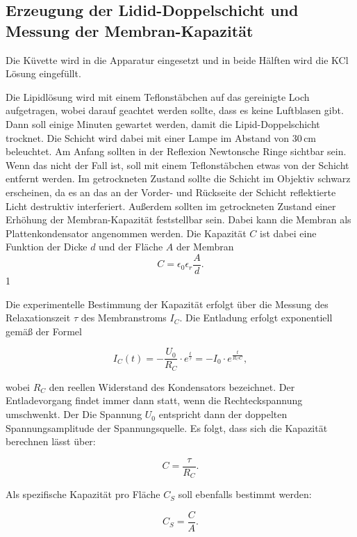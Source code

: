 \documentclass[a4paper,ngerman]{scrartcl}
\begin{document}
\subsection{Erzeugung der Lidid-Doppelschicht und Messung der Membran-Kapazität}
\label{sec:capacity}
Die Küvette wird in die Apparatur eingesetzt und in beide Hälften wird
die KCl Lösung eingefüllt.

Die Lipidlösung wird mit einem Teflonstäbchen auf das gereinigte Loch aufgetragen, wobei darauf geachtet werden sollte, dass es keine Luftblasen gibt.
Dann soll einige Minuten gewartet werden, damit die Lipid-Doppelschicht trocknet. Die Schicht wird dabei mit einer Lampe im Abstand
von 30\,cm beleuchtet. Am Anfang sollten in der Reflexion Newtonsche Ringe sichtbar sein. Wenn das nicht der Fall ist, soll mit einem
Teflonstäbchen etwas von der Schicht entfernt werden. Im getrockneten Zustand sollte die Schicht im Objektiv schwarz erscheinen, da es 
an das an der Vorder- und Rückseite der Schicht reflektierte Licht destruktiv interferiert. Außerdem sollten im getrockneten Zustand 
einer Erhöhung der Membran-Kapazität feststellbar sein. Dabei kann die Membran als Plattenkondensator angenommen werden. Die Kapazität $C$
ist dabei eine Funktion der Dicke $d$ und der Fläche $A$ der Membran
\begin{equation}
C = \epsilon_0 \epsilon_r \frac{A}{d}.
\end{equation}1

Die experimentelle Bestimmung der Kapazität erfolgt über die Messung des Relaxationszeit $\tau$ des Membranstroms $I_C$. Die Entladung erfolgt
exponentiell gemäß der Formel

\begin{equation}
  I_C(t) = - \frac{U_0}{R_C} \cdot e^{\frac{t}{\tau}} = - I_0 \cdot e^{\frac{t}{R_C C}},
\end{equation}

wobei $R_C$ den reellen Widerstand des Kondensators bezeichnet. Der Entladevorgang findet immer dann statt, wenn die Rechteckspannung umschwenkt. Der Die Spannung $U_0$ entspricht dann der doppelten Spannungsamplitude der Spannungsquelle.
Es folgt, dass sich die Kapazität berechnen lässt über:

\begin{equation}
  C = \frac{\tau}{R_C}.
\end{equation}

Als spezifische Kapazität pro Fläche $C_S$ soll ebenfalls bestimmt werden:

\begin{equation}
  C_S = \frac{C}{A}.
\end{equation}
\end{document}
